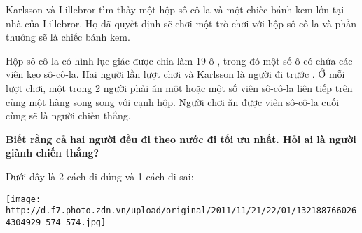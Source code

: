 Karlsson và Lillebror tìm thấy một hộp sô-cô-la và một chiếc bánh kem lớn tại nhà của Lillebror. Họ đã quyết định sẽ chơi một trò chơi với hộp sô-cô-la và phần thưởng sẽ là chiếc bánh kem.  

   Hộp sô-cô-la có hình lục giác được chia làm       19 ô      , trong đó một số ô có chứa các viên kẹo sô-cô-la. Hai người lần lượt chơi và       Karlsson là người đi trước      . Ở mỗi lượt chơi, một trong 2 người phải ăn một hoặc một số viên sô-cô-la liên tiếp trên cùng một hàng song song với cạnh hộp. Người chơi ăn được viên sô-cô-la cuối cùng sẽ là người chiến thắng.  

\textbf{    Biết rằng cả hai người đều đi theo nước đi tối ưu nhất. Hỏi ai là người giành chiến thắng?   }

   Dưới đây là 2 cách đi đúng và 1 cách đi sai:  


\texttt{[image: http://d.f7.photo.zdn.vn/upload/original/2011/11/21/22/01/1321887660264304929\_574\_574.jpg]}